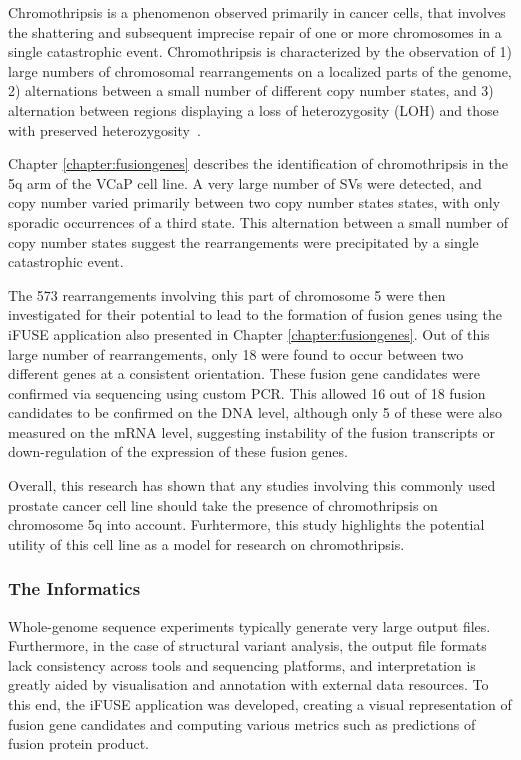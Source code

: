 Chromothripsis is a phenomenon observed primarily in cancer cells, that involves the shattering and subsequent imprecise repair of one or more chromosomes in a single catastrophic event. Chromothripsis is characterized by the observation of 1) large numbers of chromosomal rearrangements on a localized parts of the genome, 2) alternations between a small number of different copy number states, and 3) alternation between regions displaying a loss of heterozygosity (LOH) and those with preserved heterozygosity~\cite{maher2012chromothripsis}.

Chapter \ref{chapter:fusiongenes} describes the identification of chromothripsis in the 5q arm of the VCaP cell line. A very large number of SVs were detected, and copy number varied primarily between two copy number states states, with only sporadic occurrences of a third state. This alternation between a small number of copy number states suggest the rearrangements were precipitated by a single catastrophic event.

The 573 rearrangements involving this part of chromosome 5 were then investigated for their potential to lead to the formation of fusion genes using the iFUSE application also presented in Chapter \ref{chapter:fusiongenes}. Out of this large number of rearrangements, only 18 were found to occur between two different genes at a consistent orientation. These fusion gene candidates were confirmed via sequencing using custom PCR. This allowed 16 out of 18 fusion candidates to be confirmed on the DNA level, although only 5 of these were also measured on the mRNA level, suggesting instability of the fusion transcripts or down-regulation of the expression of these fusion genes.

Overall, this research has shown that any studies involving this commonly used prostate cancer cell line should take the presence of chromothripsis on chromosome 5q into account. Furhtermore, this study highlights the potential utility of this cell line as a model for research on chromothripsis.

\subsubsection{The Informatics}
Whole-genome sequence experiments typically generate very large output files. Furthermore, in the case of structural variant analysis, the output file formats lack consistency across tools and sequencing platforms, and interpretation is greatly aided by visualisation and annotation with external data resources. To this end, the iFUSE application was developed, creating a visual representation of fusion gene candidates and computing various metrics such as predictions of fusion protein product.

